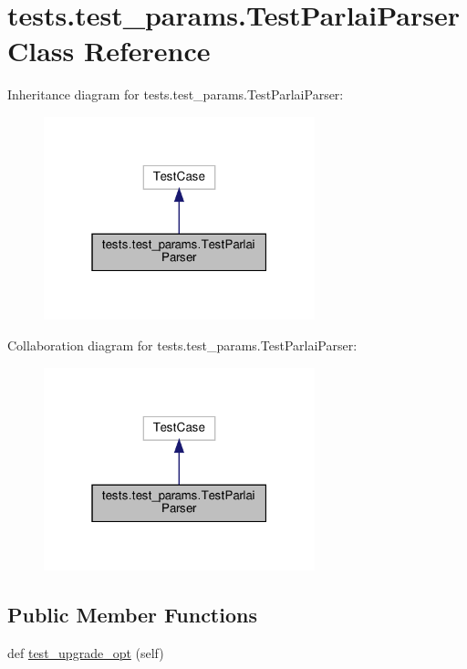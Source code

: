 \hypertarget{classtests_1_1test__params_1_1TestParlaiParser}{}\section{tests.\+test\+\_\+params.\+Test\+Parlai\+Parser Class Reference}
\label{classtests_1_1test__params_1_1TestParlaiParser}


Inheritance diagram for tests.\+test\+\_\+params.\+Test\+Parlai\+Parser\+:
\nopagebreak
\begin{figure}[H]
\begin{center}
\leavevmode
\includegraphics[width=223pt]{classtests_1_1test__params_1_1TestParlaiParser__inherit__graph}
\end{center}
\end{figure}


Collaboration diagram for tests.\+test\+\_\+params.\+Test\+Parlai\+Parser\+:
\nopagebreak
\begin{figure}[H]
\begin{center}
\leavevmode
\includegraphics[width=223pt]{classtests_1_1test__params_1_1TestParlaiParser__coll__graph}
\end{center}
\end{figure}
\subsection*{Public Member Functions}
\begin{DoxyCompactItemize}
\item 
def \hyperlink{classtests_1_1test__params_1_1TestParlaiParser_acf8ab1cdd831a5743f56623c0af87d5e}{test\+\_\+upgrade\+\_\+opt} (self)
\end{DoxyCompactItemize}


